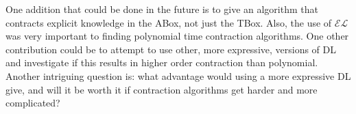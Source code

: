 One addition that could be done in the future is to give an algorithm that contracts explicit knowledge in the ABox, not just the TBox. Also, the use of $\mathcal{EL}$ was very important to finding polynomial time contraction algorithms. One other contribution could be to attempt to use other, more expressive, versions of DL and investigate if this results in higher order contraction than polynomial. Another intriguing question is: what advantage would using a more expressive DL give, and will it be worth it if contraction algorithms get harder and more complicated? 